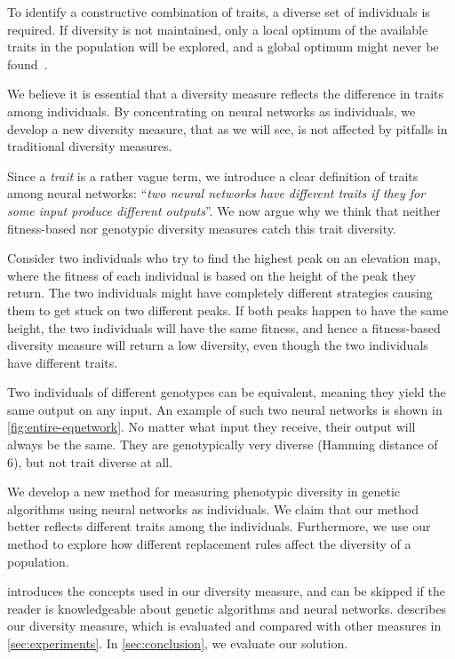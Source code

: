 To identify a constructive combination of traits, a diverse set of individuals is required. If diversity is not maintained, only a local optimum of the available traits in the population will be explored, and a global optimum might never be found~\cite{ursem2002diversity}.

We believe it is essential that a diversity measure reflects the difference in traits among individuals. By concentrating on neural networks as individuals, we develop a new diversity measure, that as we will see, is not affected by pitfalls in traditional diversity measures.

Since a \emph{trait} is a rather vague term, we introduce a clear definition of traits among neural networks: ``\emph{two neural networks have different traits if they for some input produce different outputs}''. We now argue why we think that neither fitness-based nor genotypic diversity measures catch this trait diversity. 

Consider two individuals who try to find the highest peak on an elevation map, where the fitness of each individual is based on the height of the peak they return. The two individuals might have completely different strategies causing them to get stuck on two different peaks. If both peaks happen to have the same height, the two individuals will have the same fitness, and hence a fitness-based diversity measure will return a low diversity, even though the two individuals have different traits.

Two individuals of different genotypes can be equivalent, meaning they yield the same output on any input. An example of such two neural networks is shown in \cref{fig:entire-eqnetwork}. No matter what input they receive, their output will always be the same. They are genotypically very diverse (Hamming distance of 6), but not trait diverse at all.
%

%
We develop a new method for measuring phenotypic diversity in genetic algorithms using neural networks as individuals. We claim that our method better reflects different traits among the individuals. Furthermore, we use our method to explore how different replacement rules affect the diversity of a population.

 introduces the concepts used in our diversity measure, and can be skipped if the reader is knowledgeable about genetic algorithms and neural networks.  describes our diversity measure, which is evaluated and compared with other measures in \cref{sec:experiments}. In \cref{sec:conclusion}, we evaluate our solution.
